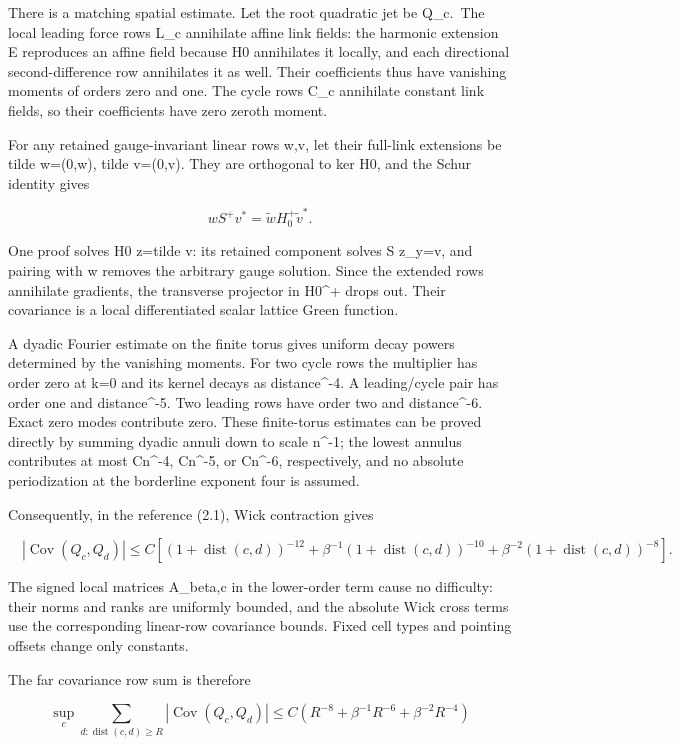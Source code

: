 \documentclass[
  11pt,
]{article}
\begin{document}
There is a matching spatial estimate. Let the root quadratic jet be
Q\_c.~The local leading force rows L\_c annihilate affine link fields:
the harmonic extension E reproduces an affine field because H0
annihilates it locally, and each directional second-difference row
annihilates it as well. Their coefficients thus have vanishing moments
of orders zero and one. The cycle rows C\_c annihilate constant link
fields, so their coefficients have zero zeroth moment.

For any retained gauge-invariant linear rows w,v, let their full-link
extensions be tilde w=(0,w), tilde v=(0,v). They are orthogonal to ker
H0, and the Schur identity gives

\[
 wS^+v^*=\widetilde w H_0^+\widetilde v^*.
\tag{6.1}
\]

One proof solves H0 z=tilde v: its retained component solves S z\_y=v,
and pairing with w removes the arbitrary gauge solution. Since the
extended rows annihilate gradients, the transverse projector in H0\^{}+
drops out. Their covariance is a local differentiated scalar lattice
Green function.

A dyadic Fourier estimate on the finite torus gives uniform decay powers
determined by the vanishing moments. For two cycle rows the multiplier
has order zero at k=0 and its kernel decays as distance\^{}-4. A
leading/cycle pair has order one and distance\^{}-5. Two leading rows
have order two and distance\^{}-6. Exact zero modes contribute zero.
These finite-torus estimates can be proved directly by summing dyadic
annuli down to scale n\^{}-1; the lowest annulus contributes at most
Cn\^{}-4, Cn\^{}-5, or Cn\^{}-6, respectively, and no absolute
periodization at the borderline exponent four is assumed.

Consequently, in the reference (2.1), Wick contraction gives

\[
 \boxed{\quad
 |\operatorname{Cov}(Q_c,Q_d)|
 \le C\left[
 (1+\operatorname{dist}(c,d))^{-12}
 +\beta^{-1}(1+\operatorname{dist}(c,d))^{-10}
 +\beta^{-2}(1+\operatorname{dist}(c,d))^{-8}
 \right].
 \quad}
\tag{6.2}
\]

The signed local matrices A\_beta,c in the lower-order term cause no
difficulty: their norms and ranks are uniformly bounded, and the
absolute Wick cross terms use the corresponding linear-row covariance
bounds. Fixed cell types and pointing offsets change only constants.

The far covariance row sum is therefore

\[
 \sup_c\sum_{d:\operatorname{dist}(c,d)\ge R}
 |\operatorname{Cov}(Q_c,Q_d)|
 \le C\left(R^{-8}+\beta^{-1}R^{-6}
                         +\beta^{-2}R^{-4}\right)
\tag{6.3}
\]
\end{document}
